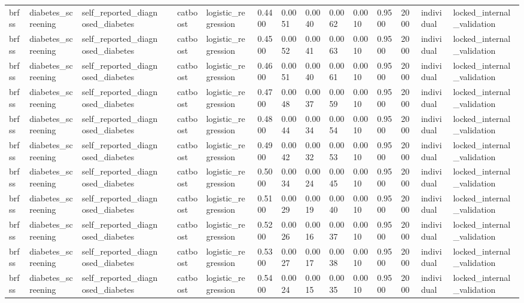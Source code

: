 \begin{tabular}{lllllllllllllll}
brfss & diabetes\_screening & self\_reported\_diagnosed\_diabetes &  & catboost & logistic\_regression & 0.4400 & 0.0051 & 0.0040 & 0.0062 & 0.0010 & 0.9500 & 2000 & individual & locked\_internal\_validation \\
brfss & diabetes\_screening & self\_reported\_diagnosed\_diabetes &  & catboost & logistic\_regression & 0.4500 & 0.0052 & 0.0041 & 0.0063 & 0.0010 & 0.9500 & 2000 & individual & locked\_internal\_validation \\
brfss & diabetes\_screening & self\_reported\_diagnosed\_diabetes &  & catboost & logistic\_regression & 0.4600 & 0.0051 & 0.0040 & 0.0061 & 0.0010 & 0.9500 & 2000 & individual & locked\_internal\_validation \\
brfss & diabetes\_screening & self\_reported\_diagnosed\_diabetes &  & catboost & logistic\_regression & 0.4700 & 0.0048 & 0.0037 & 0.0059 & 0.0010 & 0.9500 & 2000 & individual & locked\_internal\_validation \\
brfss & diabetes\_screening & self\_reported\_diagnosed\_diabetes &  & catboost & logistic\_regression & 0.4800 & 0.0044 & 0.0034 & 0.0054 & 0.0010 & 0.9500 & 2000 & individual & locked\_internal\_validation \\
brfss & diabetes\_screening & self\_reported\_diagnosed\_diabetes &  & catboost & logistic\_regression & 0.4900 & 0.0042 & 0.0032 & 0.0053 & 0.0010 & 0.9500 & 2000 & individual & locked\_internal\_validation \\
brfss & diabetes\_screening & self\_reported\_diagnosed\_diabetes &  & catboost & logistic\_regression & 0.5000 & 0.0034 & 0.0024 & 0.0045 & 0.0010 & 0.9500 & 2000 & individual & locked\_internal\_validation \\
brfss & diabetes\_screening & self\_reported\_diagnosed\_diabetes &  & catboost & logistic\_regression & 0.5100 & 0.0029 & 0.0019 & 0.0040 & 0.0010 & 0.9500 & 2000 & individual & locked\_internal\_validation \\
brfss & diabetes\_screening & self\_reported\_diagnosed\_diabetes &  & catboost & logistic\_regression & 0.5200 & 0.0026 & 0.0016 & 0.0037 & 0.0010 & 0.9500 & 2000 & individual & locked\_internal\_validation \\
brfss & diabetes\_screening & self\_reported\_diagnosed\_diabetes &  & catboost & logistic\_regression & 0.5300 & 0.0027 & 0.0017 & 0.0038 & 0.0010 & 0.9500 & 2000 & individual & locked\_internal\_validation \\
brfss & diabetes\_screening & self\_reported\_diagnosed\_diabetes &  & catboost & logistic\_regression & 0.5400 & 0.0024 & 0.0015 & 0.0035 & 0.0010 & 0.9500 & 2000 & individual & locked\_internal\_validation \\

\end{tabular}
